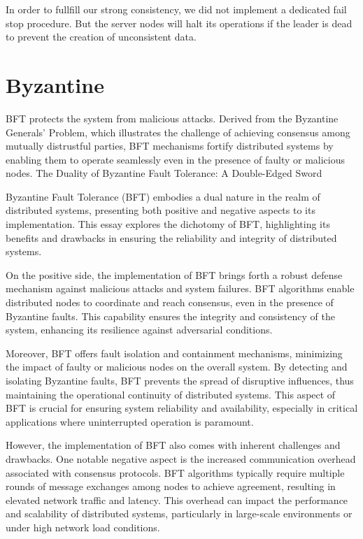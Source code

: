 In order to fullfill our strong consistency, we did not implement a dedicated fail stop procedure. But the server nodes will halt its operations if the leader is dead to prevent the creation of unconsistent data.


\section{Byzantine}\label{sec:Byzantine}
\ac{BFT} protects the system from malicious attacks. Derived from the Byzantine Generals' Problem, which illustrates the challenge of achieving 
consensus among mutually distrustful parties, BFT mechanisms fortify distributed systems by enabling them to operate seamlessly even in the presence of faulty or malicious nodes.
The Duality of Byzantine Fault Tolerance: A Double-Edged Sword

Byzantine Fault Tolerance (BFT) embodies a dual nature in the realm of distributed systems, presenting both positive and negative aspects to its implementation. This essay explores the dichotomy of BFT, highlighting its benefits and drawbacks in ensuring the reliability and integrity of distributed systems.

On the positive side, the implementation of BFT brings forth a robust defense mechanism against malicious attacks and system failures. BFT algorithms enable distributed nodes to coordinate and reach consensus, even in the presence of Byzantine faults. This capability ensures the integrity and consistency of the system, enhancing its resilience against adversarial conditions.

Moreover, BFT offers fault isolation and containment mechanisms, minimizing the impact of faulty or malicious nodes on the overall system. By detecting and isolating Byzantine faults, BFT prevents the spread of disruptive influences, thus maintaining the operational continuity of distributed systems. This aspect of BFT is crucial for ensuring system reliability and availability, especially in critical applications where uninterrupted operation is paramount.

However, the implementation of BFT also comes with inherent challenges and drawbacks. One notable negative aspect is the increased communication overhead associated with consensus protocols. BFT algorithms typically require multiple rounds of message exchanges among nodes to achieve agreement, resulting in elevated network traffic and latency. This overhead can impact the performance and scalability of distributed systems, particularly in large-scale environments or under high network load conditions.

